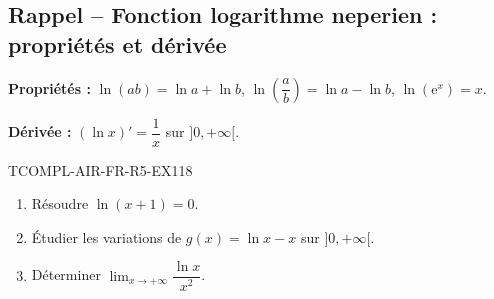 

\subsection*{Rappel -- Fonction logarithme neperien : propriétés et dérivée}

\textbf{Propriétés :} $\ln(ab) = \ln a + \ln b$, $\ln\left(\dfrac{a}{b}\right) = \ln a - \ln b$, $\ln(\mathrm{e}^x) = x$.

\textbf{Dérivée :} $(\ln x)' = \dfrac{1}{x}$ sur $]0, +\infty[$.

\begin{exercice}{TCOMPL-AIR-FR-R5-EX1}{1}{8}
\begin{enumerate}
  \item Résoudre $\ln(x + 1) = 0$.
  \item Étudier les variations de $g(x) = \ln x - x$ sur $]0, +\infty[$.
  \item Déterminer $\lim_{x \to +\infty} \dfrac{\ln x}{x^2}$.
\end{enumerate}
\end{exercice}

